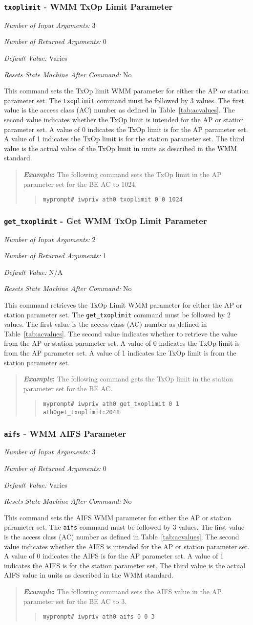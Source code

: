 \documentclass[10pt,fullpage]{article}
\newcommand{\mytt}[1]{{\texttt{#1}}}
\newcommand{\bv}{\begin{verse}}
\newcommand{\ev}{\end{verse}}
\newcommand{\cmd}[1]{{\texttt{myprompt\# #1}}}
\newcommand{\argdesc}[4]{\begin{description}
\itemsep -6pt
\item \textit{Number of Input Arguments:} #1
\item \textit{Number of Returned Arguments:} #2
\item \textit{Default Value:} #3
\item \textit{Resets State Machine After Command:} #4
\end{description}
}
\newenvironment{example}{\begin{quote}\textbf{\textit{Example}:}}{\end{quote}}
\begin{document}
\subsubsection{\mytt{txoplimit} - WMM TxOp Limit Parameter}
\argdesc{3}{0}{Varies}{No}
This command sets the TxOp limit WMM parameter for either the AP or
station parameter set.  The \mytt{txoplimit} command must be followed
by 3 values.  The first value is the access class (AC) number as
defined in Table~\ref{tab:acvalues}.  The second value indicates
whether the TxOp limit is intended for the AP or station parameter
set.  A value of 0 indicates the TxOp limit is for the AP parameter
set.  A value of 1 indicates the TxOp limit is for the station
parameter set.  The third value is the actual value of the TxOp limit
in units as described in the WMM standard.
\begin{example}
  The following command sets the TxOp limit in the AP parameter set
  for the BE AC to 1024.
  \bv
  \cmd{iwpriv ath0 txoplimit 0 0 1024}
  \ev
\end{example}

\subsubsection{\mytt{get\_txoplimit} - Get WMM TxOp Limit Parameter}
\argdesc{2}{1}{N/A}{No}
This command retrieves the TxOp Limit WMM parameter for either the AP
or station parameter set. The \mytt{get\_txoplimit} command must be
followed by 2 values.  The first value is the access class (AC) number
as defined in Table~\ref{tab:acvalues}.  The second value indicates
whether to retrieve the value from the AP or station parameter set. A
value of 0 indicates the TxOp limit is from the AP parameter set.  A
value of 1 indicates the TxOp limit is from the station parameter set.
\begin{example}
  The following command gets the TxOp limit in the station parameter
  set for the BE AC.
  \bv
  \cmd{iwpriv ath0 get\_txoplimit 0 1}\\
  \mytt{ath0\hspace{32pt}get\_txoplimit:2048}
  \ev
\end{example}

\subsubsection{\mytt{aifs} - WMM AIFS Parameter}
\argdesc{3}{0}{Varies}{No}
This command sets the AIFS WMM parameter for either the AP or station
parameter set.  The \mytt{aifs} command must be followed by 3 values.
The first value is the access class (AC) number as defined in
Table~\ref{tab:acvalues}.  The second value indicates whether the AIFS
is intended for the AP or station parameter set.  A value of 0
indicates the AIFS is for the AP parameter set.  A value of 1
indicates the AIFS is for the station parameter set.  The third value
is the actual AIFS value in units as described in the WMM standard.
\begin{example}
  The following command sets the AIFS value in the AP parameter set
  for the BE AC to 3.
  \bv
  \cmd{iwpriv ath0 aifs 0 0 3}
  \ev
\end{example}
\end{document}
